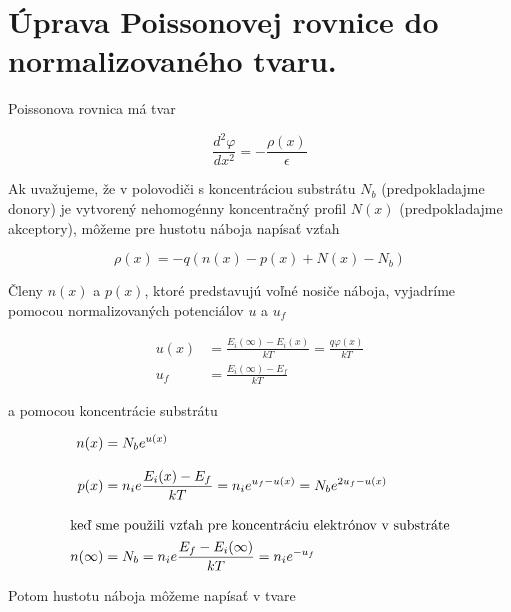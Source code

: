 
\chapter{Úprava Poissonovej rovnice do normalizovaného tvaru.}\label{app:AppendixB}

Poissonova rovnica má tvar

\begin{equation}\label{eq:B.1}
  \frac{d^{2}\varphi}{dx^2} = - \frac{\rho(x)}{\epsilon}
\end{equation}

Ak uvažujeme, že v polovodiči s koncentráciou substrátu $N_b$
(predpokladajme donory) je vytvorený nehomogénny koncentračný profil
$N(x)$ (predpokladajme akceptory), môžeme pre hustotu náboja napísať
vzťah

\begin{equation}\label{eq:B.2}
  \rho(x) = - q (n(x) - p(x) + N(x) -N_b)
\end{equation}

Členy $n(x)$ a $p(x)$, ktoré predstavujú voľné nosiče náboja,
vyjadríme pomocou normalizovaných potenciálov $u$ a $u_f$

\begin{subequations}\label{eq:B.3}
  \begin{align}
    u(x) &= \frac{E_i(\infty) - E_i(x)}{kT} = \frac{q\varphi(x)}{kT} \label{eq:B.3a}\\[0.3cm]
    u_f &= \frac{E_i(\infty) - E_f}{kT} \label{eq:B.3b}
  \end{align}
\end{subequations}

a pomocou koncentrácie substrátu

\begin{subequations}\label{eq:B.4}
  \begin{align}
    n(x) &= N_b {e}^{u(x)}\label{eq:B.4a}\\[0.3cm]
    p(x) &= n_i {e}\frac{E_i(x) - E_f}{kT} = n_i {e}^{u_f-u(x)} = N_b {e}^{2u_f-u(x)}\label{eq:B.4b}\\[0.3cm]
    \intertext{keď sme použili vzťah pre koncentráciu elektrónov v substráte}
    n(\infty) &= N_b = n_i {e}\frac{E_f-E_i(\infty)}{kT} = n_i {e}^{-u_f}\label{eq:B.4c}
\end{align}
\end{subequations}

Potom hustotu náboja môžeme napísať v tvare

